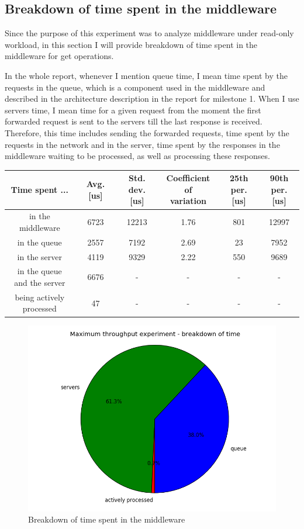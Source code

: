 \documentclass[11pt]{article}
\begin{document}
\subsection{Breakdown of time spent in the middleware}
\label{sec:time-breakdown}

Since the purpose of this experiment was to analyze middleware under read-only workload, in this section I will provide breakdown of time spent in the middleware for get operations.
\medskip

In the whole report, whenever I mention queue time, I mean time spent by the requests in the queue, which is a component used in the middleware and described in the architecture description in the report for milestone 1. When I use servers time, I mean time for a given request from the moment the first forwarded request is sent to the servers till the last response is received. Therefore, this time includes sending the forwarded requests, time spent by the requests in the network and in the server, time spent by the responses in the middleware waiting to be processed, as well as processing these responses.
\medskip

\begin{tabular}{|c|c|c|c|c|c|}
\hline \bf{Time spent ...} & \bf{Avg. [us]} & \parbox[t]{1.9cm}{\bf{Std.\\dev. [us]}} & \parbox[t]{2.6cm}{\bf{Coefficient of \\variation}} & \parbox[t]{1.7cm}{\bf{25th \\per. [us]}} & \parbox[t]{1.7cm}{\bf{90th \\per. [us]}} \\[3ex]
\hline in the middleware & 6723 & 12213 & 1.76 & 801 & 12997 \\
\hline in the queue & 2557 & 7192 & 2.69 & 23 & 7952\\
\hline in the server & 4119 & 9329 & 2.22 & 550 & 9689\\
\hline \parbox[t]{3cm}{in the queue\\and the server} & 6676 & - & - & -&-\\[3ex]
\hline \parbox[t]{3cm}{being actively\\processed} & 47 & - & - & -&-\\
\hline
\end{tabular}
\medskip

\begin{figure}
\centering
\includegraphics[width=0.5\linewidth]{plots/max_throughput-breakdown}
\caption{Breakdown of time spent in the middleware}
\label{fig:max-throughput-breakdown}
\end{figure}
\end{document}

